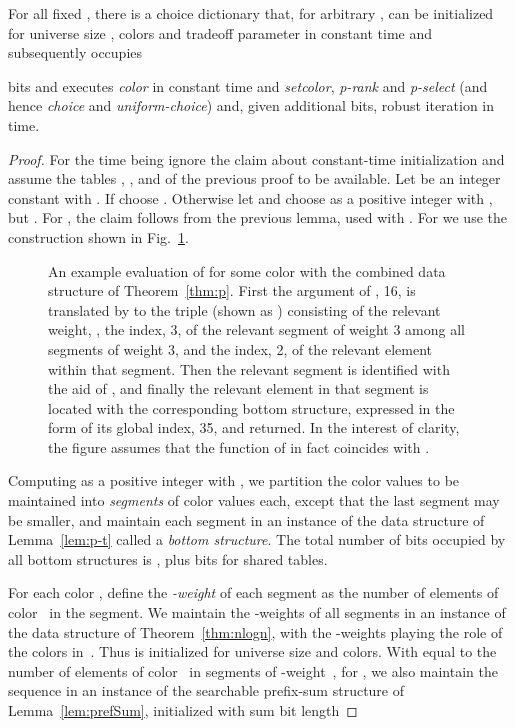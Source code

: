 \documentclass[envcountsame,envcountsect,undated,nolinenumbers]{lnthi}
\def\Tvn#1{\hbox{\textit{#1\/}}}
\def\Tmyw{\copy\Twbox}
\begin{document}
\begin{theorem}
\label{thm:p}For all fixed ,
there is a choice dictionary that, for arbitrary
,
can be initialized for universe
size ,  colors and tradeoff parameter 
in constant time
and subsequently occupies

bits and executes \Tvn{color} in
constant time and \Tvn{setcolor},
\Tvn{p-rank} and \Tvn{p-select} (and hence \Tvn{choice}
and \Tvn{uniform-choice})
and, given  additional bits,
robust iteration in  time.
\end{theorem}

\begin{proof}
For the time being ignore the claim about
constant-time initialization and assume
the tables , ,
 and 
of the previous proof
to be available.
Let  be an integer constant with .
If  choose .
Otherwise let 
and choose  as a positive integer with
, but .
For , the claim follows from the previous
lemma, used with . 
For 
we use the construction 
shown
in
Fig.~\ref{fig:select}.

\begin{figure}
\begin{center}
\end{center}
\caption{An example evaluation of 
for some color  with
the combined data structure of Theorem~\ref{thm:p}.
First the argument of , 16,
is translated by 
to the triple  
(shown as \Tmyw)
consisting of the relevant
weight, , the index, 3, of the relevant segment of
weight 3 among all segments of weight 3, and the
index, 2, of the relevant element within that segment.
Then the relevant segment is identified with
the aid of , and finally the relevant
element in that segment is located
with the corresponding bottom structure,
expressed in the form of
its global index, 35, and returned.
In the interest of clarity,
the figure assumes that the 
function of  in fact coincides
with .}
\label{fig:select}
\end{figure}

Computing  as a positive integer with
, we partition the 
color values to be maintained into
 \emph{segments} of 
color values each, except that the last segment
may be smaller, and maintain each segment in an
instance of the data structure of
Lemma~\ref{lem:p-t} called a
\emph{bottom structure}.
The total number of bits occupied by all
bottom structures is
,
plus  bits
for shared tables.

For each color ,
define the \emph{-weight} of each segment
as the number of elements of color~
in the segment.
We maintain the -weights of all segments in an
instance 
of the data structure of Theorem~\ref{thm:nlogn},
with the -weights
playing the role of the colors in~.
Thus  is initialized for universe size 
and  colors.
With  equal to the number of
elements of color~ in segments of -weight~,
for , we also maintain the sequence
 in an instance  of the
searchable prefix-sum structure of Lemma~\ref{lem:prefSum},
initialized with sum bit length


\end{proof}
\end{document}
